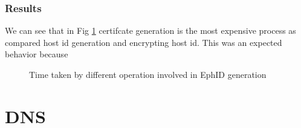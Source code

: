 \subsubsection{Results}
We can see that in Fig \ref{fig:perf_ephid} certifcate generation is the most expensive process as compared host id generation and encrypting host id. This was an expected behavior because 
\begin{figure}[th!!]
\centering
\noindent
{}
\decoRule
\caption[EphID Generation Ops]{Time taken by different operation involved in EphID generation}
\label{fig:perf_ephid}
\end{figure}

\section{DNS}
